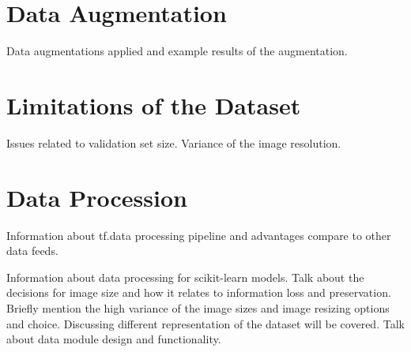 \section{Data Augmentation}
Data augmentations applied and example results of the augmentation.

\section{Limitations of the Dataset}
Issues related to validation set size. Variance of the image resolution.

\section{Data Procession}
Information about tf.data processing pipeline and advantages compare to other data feeds.

Information about data processing for scikit-learn models.
Talk about the decisions for image size and how it relates to information loss and preservation. Briefly mention the high variance of the image sizes and image resizing options and choice.
Discussing different representation of the dataset will be covered.
Talk about data module design and functionality.
\clearpage